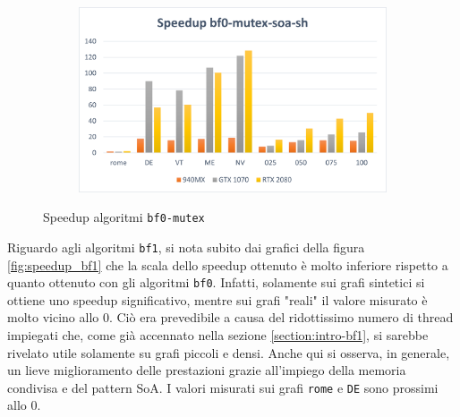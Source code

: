 \documentclass[12pt,a4paper,oneside]{book}
\begin{document}
\begin{figure}[b]
\begin{subfigure}{.5\textwidth}
		\end{subfigure}%
		\begin{subfigure}{.5\textwidth}
			\centering
			\includegraphics[width=\textwidth]{speedup_bf0-mutex-soa-sh}
		\end{subfigure}
		\caption{Speedup algoritmi \texttt{bf0-mutex}}
		\label{fig:speedup_bf0-mutex}
	\end{figure}

	Riguardo agli algoritmi \texttt{bf1}, si nota subito dai grafici della figura \ref{fig:speedup_bf1} che la scala dello speedup ottenuto è molto inferiore rispetto a quanto ottenuto con gli algoritmi \texttt{bf0}. Infatti, solamente sui grafi sintetici si ottiene uno speedup significativo, mentre sui grafi "reali" il valore misurato è molto vicino allo $0$. Ciò era prevedibile a causa del ridottissimo numero di thread impiegati che, come già accennato nella sezione \ref{section:intro-bf1}, si sarebbe rivelato utile solamente su grafi piccoli e densi. Anche qui si osserva, in generale, un lieve miglioramento delle prestazioni grazie all'impiego della memoria condivisa e del pattern SoA. I valori misurati sui grafi \texttt{rome} e \texttt{DE} sono prossimi allo $0$.
\end{document}
